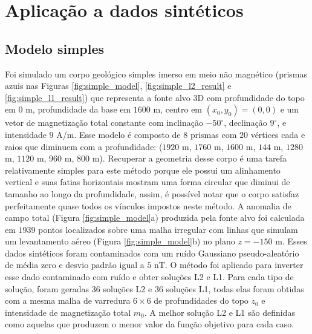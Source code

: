 \chapter{Aplicação a dados sintéticos}

\section{Modelo simples}

Foi simulado um corpo geológico simples imerso em meio não magnético (prismas azuis nas Figuras 
\ref{fig:simple_model}, \ref{fig:simple_l2_result} e \ref{fig:simple_l1_result})
que representa a fonte alvo 3D com profundidade do topo em $0$ m, profundidade da base em $1600$ m, centro em $ (x_0, y_0) = (0, 0) $ e um vetor de magnetização total constante com inclinação $-50^{\circ}$, declinação $9^{\circ}$, e intensidade $9$ A/m.
Esse modelo é composto de $ 8 $ prismas com $ 20 $ vértices cada e raios que diminuem com a profundidade: ($ 1920 $ m, $ 1760 $ m, $ 1600 $ m, $ 144 $ m, $ 1280 $ m, $ 1120 $ m, $ 960 $ m, $ 800 $ m).
Recuperar a geometria desse corpo é uma tarefa relativamente simples para este método porque ele possui um alinhamento vertical e suas fatias horizontais mostram uma forma circular que diminui de tamanho ao longo da profundidade, assim, é possível notar que o corpo satisfaz perfeitamente quase todos os vínculos impostos neste método.
A anomalia de campo total (Figura \ref{fig:simple_model}a) produzida pela fonte alvo foi calculada em $1939$ pontos localizados sobre uma malha irregular com linhas que simulam um levantamento aéreo (Figura \ref{fig:simple_model}b) no plano $ z=-150 $ m. Esses dados sintéticos foram contaminados com um ruído Gaussiano pseudo-aleatório de média zero e desvio padrão igual a $5$ nT.
O método foi aplicado para inverter esse dado contaminado com ruído e obter soluções L2 e L1.
Para cada tipo de solução, foram geradas $36$ soluções L2 e $36$ soluções L1, 
todas elas foram obtidas com a mesma malha de varredura $6 \times 6$ de profundidades do topo $z_{0}$ e intensidade de magnetização total $m_{0}$.
A melhor solução L2 e L1 são definidas como aquelas que produzem o menor valor da função objetivo para cada caso.

